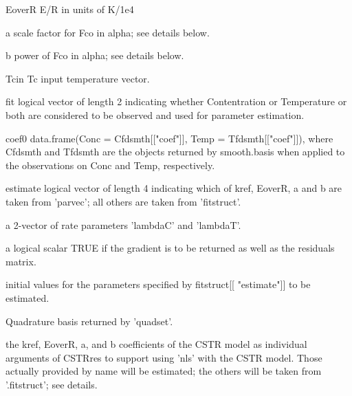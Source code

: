 \documentclass{article}
\begin{document}
\begin{Arguments}
\begin{ldescription}
{\item[EoverR] E/R in units of K/1e4 

\item[a] scale factor for Fco in alpha;  see details below.

\item[b] power of Fco in alpha;  see details below.

\item[Tcin] Tc input temperature vector.

\item[fit] logical vector of length 2 indicating whether Contentration or
Temperature or both are considered to be observed and used for
parameter estimation. 

\item[coef0] data.frame(Conc = Cfdsmth[["coef"]], Temp = Tfdsmth[["coef"]]),
where Cfdsmth and Tfdsmth are the objects returned by
smooth.basis when applied to the observations on Conc and Temp,
respectively.  

\item[estimate] logical vector of length 4 indicating which of kref, EoverR, a
and b are taken from 'parvec';  all others are taken from
'fitstruct'.  

}

\item[\code{lambda}] a 2-vector of rate parameters 'lambdaC' and 'lambdaT'.  

\item[\code{gradwrd}] a logical scalar TRUE if the gradient is to be returned as well as
the residuals matrix.      

\item[\code{parvec, par}] initial values for the parameters specified by fitstruct[[
"estimate"]] to be estimated. 

\item[\code{CSTRbasis}] Quadrature basis returned by 'quadset'.  

\item[\code{kref, EoverR, a, b}] the kref, EoverR, a, and b coefficients of the CSTR model as
individual arguments of CSTRres to support using 'nls' with the CSTR
model.  Those actually provided by name will be estimated;  the
others will be taken from '.fitstruct';  see details.   

\end{ldescription}
\end{Arguments}
\end{document}
